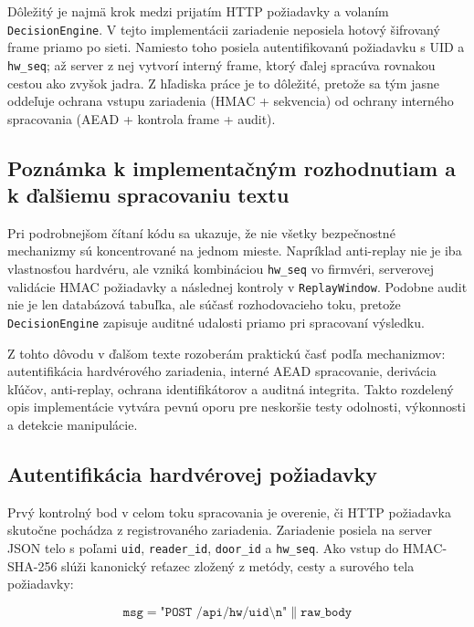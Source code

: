 \documentclass[journal,a4paper,onecolumn]{IEEEtran}
\begin{document}
Dôležitý je najmä krok medzi prijatím HTTP požiadavky a volaním \texttt{DecisionEngine}. V tejto implementácii zariadenie neposiela hotový šifrovaný frame priamo po sieti. Namiesto toho posiela autentifikovanú požiadavku s UID a \texttt{hw\_seq}; až server z nej vytvorí interný frame, ktorý ďalej spracúva rovnakou cestou ako zvyšok jadra. Z hľadiska práce je to dôležité, pretože sa tým jasne oddeľuje ochrana vstupu zariadenia (HMAC + sekvencia) od ochrany interného spracovania (AEAD + kontrola frame + audit).

\subsection{Poznámka k implementačným rozhodnutiam a k ďalšiemu spracovaniu textu}

Pri podrobnejšom čítaní kódu sa ukazuje, že nie všetky bezpečnostné mechanizmy sú koncentrované na jednom mieste. Napríklad anti-replay nie je iba vlastnosťou hardvéru, ale vzniká kombináciou \texttt{hw\_seq} vo firmvéri, serverovej validácie HMAC požiadavky a následnej kontroly v \texttt{ReplayWindow}. Podobne audit nie je len databázová tabuľka, ale súčasť rozhodovacieho toku, pretože \texttt{DecisionEngine} zapisuje auditné udalosti priamo pri spracovaní výsledku.

Z tohto dôvodu v ďalšom texte rozoberám praktickú časť podľa mechanizmov: autentifikácia hardvérového zariadenia, interné AEAD spracovanie, derivácia kľúčov, anti-replay, ochrana identifikátorov a auditná integrita. Takto rozdelený opis implementácie vytvára pevnú oporu pre neskoršie testy odolnosti, výkonnosti a detekcie manipulácie.

\subsection{Autentifikácia hardvérovej požiadavky}

Prvý kontrolný bod v celom toku spracovania je overenie, či HTTP požiadavka skutočne pochádza z registrovaného zariadenia. Zariadenie posiela na server JSON telo s poľami \texttt{uid}, \texttt{reader\_id}, \texttt{door\_id} a \texttt{hw\_seq}. Ako vstup do HMAC-SHA-256 slúži kanonický reťazec zložený z metódy, cesty a surového tela požiadavky:

\begin{equation}
\texttt{msg} = \texttt{"POST /api/hw/uid\textbackslash n"} \parallel \texttt{raw\_body}
\end{equation}
\end{document}
